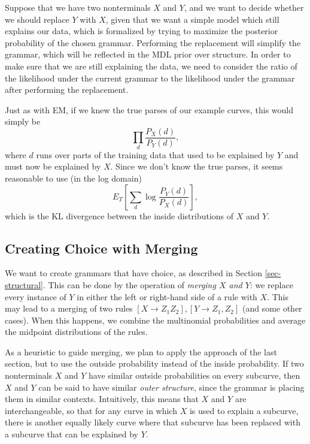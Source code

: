 Suppose that we have two nonterminals $X$ and $Y$, and we want to
decide whether we should replace $Y$ with $X$, given that we want a
simple model which still explains our data, which is formalized by
trying to maximize the posterior probability of the chosen
grammar. Performing the replacement will simplify the grammar, which
will be reflected in the MDL prior over structure. In order to make
sure that we are still explaining the data, we need to consider the
ratio of the likelihood under the current grammar to the likelihood
under the grammar after performing the replacement.

Just as with EM, if we knew the true parses of our example curves,
this would simply be $$\prod_d \frac{P_X(d)}{P_Y(d)},$$ where $d$ runs
over parts of the training data that used to be explained by $Y$ and
must now be explained by $X$. Since we don't know the true parses, it
seems reasonable to use (in the log domain)
$$E_T \left[ \sum_d \log \frac{P_Y(d)}{P_X(d)} \right],$$
which is the KL divergence between the inside distributions of $X$ and $Y$.
 


\subsection{Creating Choice with Merging}
\label{sec-merge}

We want to create grammars that have choice, as described in Section
\ref{sec-structural}. This can be done by the operation of \emph{merging $X$ and
  $Y$}: we replace every instance of $Y$ in either the left or
right-hand side of a rule with $X$. This may lead to a merging of two
rules $[X \to Z_1 Z_2], [Y\to Z_1,Z_2]$ (and some other cases). When
this happens, we combine the multinomial probabilities and average the
midpoint distributions of the rules.

As a heuristic to guide merging, we plan to apply the approach of the
last section, but to use the outside probability instead of the inside
probability. If two nonterminals $X$ and $Y$ have similar outside
probabilities on every subcurve, then $X$ and $Y$ can be said to have
similar \emph{outer structure}, since the grammar is placing them in
similar contexts. Intuitively, this means that $X$ and $Y$ are
interchangeable, so that for any curve in which $X$ is used to explain
a subcurve, there is another equally likely curve where that subcurve
has been replaced with a subcurve that can be explained by $Y$.

